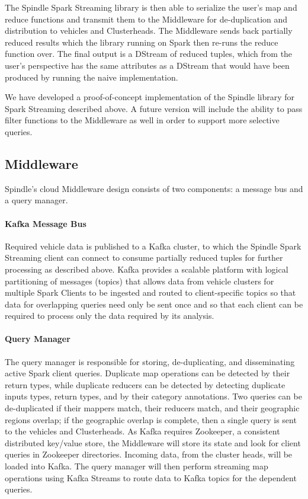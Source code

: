 \documentclass{thesis}
\begin{document}
    The Spindle Spark Streaming library is then able to serialize the user's map and reduce functions and transmit
    them to the Middleware for de-duplication and distribution to vehicles and Clusterheads. The Middleware
    sends back partially reduced results which the library running on Spark then re-runs the reduce function over.
    The final output is a DStream of reduced tuples, which from the user's perspective has the same attributes as 
    a DStream that would have been produced by running the naive implementation.

    We have developed a proof-of-concept implementation of the Spindle library for Spark Streaming described above.
    A future version will include the ability to pass filter functions to the Middleware as well in order to support
    more selective queries.
\subsection{Middleware}
    Spindle's cloud Middleware design consists of two components: a message bus and a query manager.
    \paragraph{Kafka Message Bus}
        Required vehicle data is published to a Kafka cluster, to which the Spindle Spark Streaming client can
        connect to consume partially reduced tuples for further processing as described above. Kafka provides
        a scalable platform with logical partitioning of messages (topics) that allows data from vehicle clusters
        for multiple Spark Clients to be ingested and routed to client-specific topics so that data for overlapping
        queries need only be sent once and so that each client can be required to process only the data required by
        its analysis.
    \paragraph{Query Manager}
        The query manager is responsible for storing, de-duplicating, and disseminating active Spark client queries.
        Duplicate map operations can be detected by their return types, while duplicate reducers can be detected
        by detecting duplicate inputs types, return types, and by their category annotations. Two queries can be
        de-duplicated if their mappers match, their reducers match, and their geographic regions overlap; if the
        geographic overlap is complete, then a single query is sent to the vehicles and Clusterheads.
        As Kafka requires Zookeeper, a consistent distributed key/value store, the Middleware will store its
        state and look for client queries in Zookeeper directories.
        Incoming data, from the cluster heads, will be loaded into Kafka. The query manager will then perform
        streaming map operations using Kafka Streams to route data to Kafka topics for the dependent queries.
\end{document}
